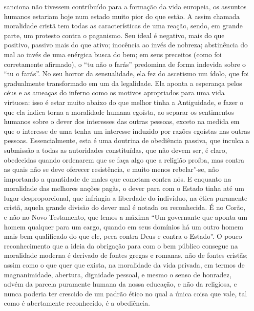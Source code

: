 sanciona não tivessem contribuído para a formação da vida europeia, os
assuntos humanos estariam hoje num estado muito pior do que estão. A
assim chamada moralidade cristã tem todas as características de uma
reação, sendo, em grande parte, um protesto contra o paganismo. Seu
ideal é negativo, mais do que positivo, passivo mais do que ativo;
inocência ao invés de nobreza; abstinência do mal ao invés de uma
enérgica busca do bem; em seus preceitos (como foi corretamente afirmado), o ``tu não
o farás'' predomina de forma indevida sobre o ``tu o farás''. No seu
horror da sensualidade, ela fez do ascetismo um ídolo, que foi
gradualmente transformado em um da legalidade. Ela aponta a esperança
pelos céus e as ameaças do inferno como os motivos apropriados
para uma vida virtuosa: isso é estar muito abaixo do que melhor tinha a
Antiguidade, e fazer o que ela indica torna a moralidade humana
egoísta, ao separar os sentimentos humanos sobre o dever dos interesses
das outras pessoas, exceto na medida em que o interesse de uma tenha um
interesse induzido por razões egoístas nas outras pessoas.
Essencialmente, esta é uma doutrina de obediência passiva, que inculca
a submissão a todas as autoridades constituídas, que não devem ser, é
claro, obedecidas quando ordenarem que se faça algo que a religião
proíba, mas contra as quais não se deve oferecer resistência, e muito
menos rebelar"-se, não importando a quantidade de males que cometam
contra nós. E enquanto na moralidade das melhores nações pagãs, o
dever para com o Estado tinha até um lugar desproporcional, que
infringia a liberdade do indivíduo, na ética puramente cristã, aquela
grande divisão do dever mal é notada ou reconhecida. É no
Corão, e não no Novo Testamento, que lemos a
máxima ``Um governante que aponta um homem qualquer para um cargo,
quando em seus domínios há um outro homem mais bem qualificado do que
ele, peca contra Deus e contra o Estado''. O pouco reconhecimento que a
ideia da obrigação para com o bem público consegue na moralidade
moderna é derivado de fontes gregas e romanas, não de fontes cristãs;
assim como o que quer que exista, na moralidade da vida privada, em
termos de magnanimidade, abertura, dignidade pessoal, e mesmo o senso
de honradez, advém da parcela puramente humana da nossa educação, e não
da religiosa, e nunca poderia ter crescido de um padrão ético no qual a
única coisa que vale, tal como é abertamente reconhecido, é a obediência. 

